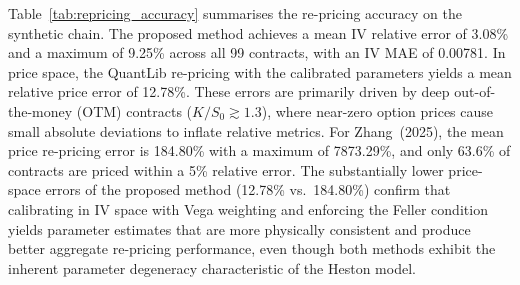 Table~\ref{tab:repricing_accuracy} summarises the re-pricing accuracy on the synthetic chain. The proposed method achieves a mean IV relative error of 3.08\% and a maximum of 9.25\% across all 99 contracts, with an IV MAE of 0.00781. In price space, the QuantLib re-pricing with the calibrated parameters yields a mean relative price error of 12.78\%. These errors are primarily driven by deep out-of-the-money (OTM) contracts ($K/S_0 \gtrsim 1.3$), where near-zero option prices cause small absolute deviations to inflate relative metrics. For Zhang~(2025), the mean price re-pricing error is 184.80\% with a maximum of 7873.29\%, and only 63.6\% of contracts are priced within a 5\% relative error. The substantially lower price-space errors of the proposed method (12.78\% vs.\ 184.80\%) confirm that calibrating in IV space with Vega weighting and enforcing the Feller condition yields parameter estimates that are more physically consistent and produce better aggregate re-pricing performance, even though both methods exhibit the inherent parameter degeneracy characteristic of the Heston model.
